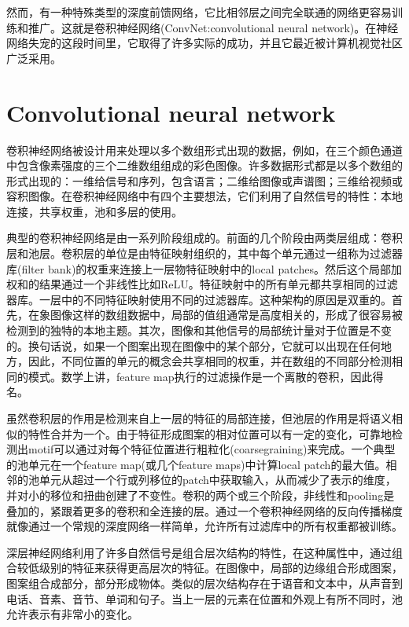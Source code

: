然而，有一种特殊类型的深度前馈网络，它比相邻层之间完全联通的网络更容易训练和推广。这就是卷积神经网络(ConvNet:convolutional neural network)。在神经网络失宠的这段时间里，它取得了许多实际的成功，并且它最近被计算机视觉社区广泛采用。

\section{Convolutional neural network}
卷积神经网络被设计用来处理以多个数组形式出现的数据，例如，在三个颜色通道中包含像素强度的三个二维数组组成的彩色图像。许多数据形式都是以多个数组的形式出现的：一维给信号和序列，包含语言；二维给图像或声谱图；三维给视频或容积图像。在卷积神经网络中有四个主要想法，它们利用了自然信号的特性：本地连接，共享权重，池和多层的使用。

典型的卷积神经网络是由一系列阶段组成的。前面的几个阶段由两类层组成：卷积层和池层。卷积层的单位是由特征映射组织的，其中每个单元通过一组称为过滤器库(filter bank)的权重来连接上一层物特征映射中的local patches。然后这个局部加权和的结果通过一个非线性比如ReLU。特征映射中的所有单元都共享相同的过滤器库。一层中的不同特征映射使用不同的过滤器库。这种架构的原因是双重的。首先，在象图像这样的数组数据中，局部的值组通常是高度相关的，形成了很容易被检测到的独特的本地主题。其次，图像和其他信号的局部统计量对于位置是不变的。换句话说，如果一个图案出现在图像中的某个部分，它就可以出现在任何地方，因此，不同位置的单元的概念会共享相同的权重，并在数组的不同部分检测相同的模式。数学上讲，feature map执行的过滤操作是一个离散的卷积，因此得名。

虽然卷积层的作用是检测来自上一层的特征的局部连接，但池层的作用是将语义相似的特性合并为一个。由于特征形成图案的相对位置可以有一定的变化，可靠地检测出motif可以通过对每个特征位置进行粗粒化(coarsegraining)来完成。一个典型的池单元在一个feature map(或几个feature maps)中计算local patch的最大值。相邻的池单元从超过一个行或列移位的patch中获取输入，从而减少了表示的维度，并对小的移位和扭曲创建了不变性。卷积的两个或三个阶段，非线性和pooling是叠加的，紧跟着更多的卷积和全连接的层。通过一个卷积神经网络的反向传播梯度就像通过一个常规的深度网络一样简单，允许所有过滤库中的所有权重都被训练。

深层神经网络利用了许多自然信号是组合层次结构的特性，在这种属性中，通过组合较低级别的特征来获得更高层次的特征。在图像中，局部的边缘组合形成图案，图案组合成部分，部分形成物体。类似的层次结构存在于语音和文本中，从声音到电话、音素、音节、单词和句子。当上一层的元素在位置和外观上有所不同时，池允许表示有非常小的变化。

